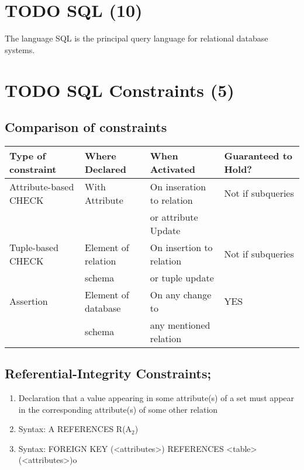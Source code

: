 \documentclass[11pt]{article}
\begin{document}
\section{\textbf{TODO} SQL (10)}
\label{sec-5}

  The language SQL is the principal query language for relational
  database systems.
\section{\textbf{TODO} SQL Constraints (5)}
\label{sec-6}

  
\subsection{Comparison of constraints}
\label{sec-6.1}


\begin{center}
\begin{tabular}{llll}
 Type of constraint     &  Where Declared       &  When Activated             &  Guaranteed to Hold?  \\
\hline
 Attribute-based CHECK  &  With Attribute       &  On inseration to relation  &  Not if subqueries    \\
                        &                       &  or attribute Update        &                       \\
\hline
 Tuple-based CHECK      &  Element of relation  &  On insertion to relation   &  Not if subqueries    \\
                        &  schema               &  or tuple update            &                       \\
\hline
 Assertion              &  Element of database  &  On any change to           &  YES                  \\
                        &  schema               &  any mentioned relation     &                       \\
\end{tabular}
\end{center}




\subsection{Referential-Integrity Constraints;}
\label{sec-6.2}

\begin{enumerate}
\item Declaration that a value appearing in some attribute(s) of a set
      must appear in the corresponding attribute(s) of some other
      relation
\item Syntax: A REFERENCES R(A$_2$)
\item Syntax: FOREIGN KEY (<attributes>) REFERENCES <table>(<attributes>)o
\end{enumerate}
\end{document}

